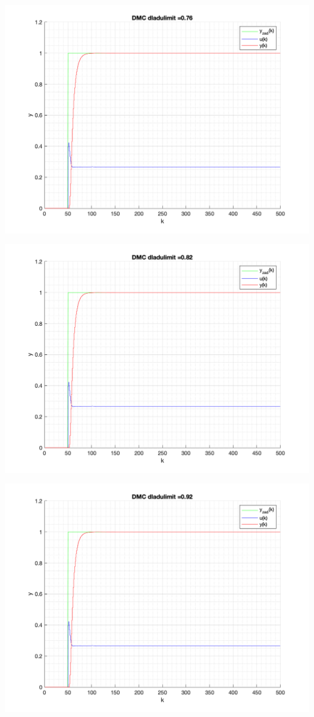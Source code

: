 \documentclass[a4paper, 11pt]{article}
\begin{document}
\begin{enumerate}
 \includegraphics[width=\linewidth]{./ModelsP6_dulimit/P4_DMC_dulimit_0_76_png.png} 
 
 \includegraphics[width=\linewidth]{./ModelsP6_dulimit/P4_DMC_dulimit_0_82_png.png} 
 
 \includegraphics[width=\linewidth]{./ModelsP6_dulimit/P4_DMC_dulimit_0_92_png.png} 
 

\end{enumerate}
\end{document}
